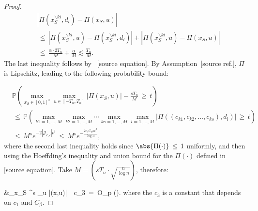 \documentclass[twoside,11pt]{article}
\makeatletter
\newcommand{\discardlabel}[1]{}
\newcommand{\discardtwo}[2]{}
\newcommand{\legacyref}[1]{\textup{[source ref.]}}
\newcommand{\legacyeqref}[1]{\textup{[source equation]}}
\newenvironment{legacycomparison}{%
  \begingroup\color{legacygray}%
  \let\label\discardlabel
  \let\originallabel\discardlabel
  \let\ref\legacyref
  \let\pageref\legacyref
  \let\eqref\legacyeqref
  \let\cref\legacyref
  \let\Cref\legacyref
  \let\autoref\legacyref
  \let\aliasref\discardtwo
}{\endgroup}
\newcommand{\aliasref}[2]{%
  \@ifundefined{r@#2}{}{%
    \expandafter\let\csname r@#1\expandafter\endcsname\csname r@#2\endcsname}}
\makeatother
\begin{document}
\begin{legacycomparison}
\begin{proof}
\begin{align*}
    &|\Pi(x_S^{\backslash ki}, d_l) - \Pi(x_S,u)| \\
    &\,\le\, |\Pi(x_S^{\backslash ki},u) - \Pi(x_S^{\backslash ki}, d_l)| + |\Pi(x_S^{\backslash ki}, u) - \Pi(x_S,u)| \\
    &\,\le\, \frac{\alpha \cdot 2T_n}{M} + \frac{\alpha}{M} \lesssim \frac{T_n}{M}.
\end{align*}
The last inequality follows by ~\eqref{lip_for_Pi}. 
By Assumption~\ref{assump:lip}, $\Pi$ is Lipschitz, leading to the following probability bound:

\begin{align*}
    &\mathbb{P}\left(\max_{x_S \in [0,1]^s} \max_{u \in [-T_n,T_n]} |\Pi(x_S,u)| - \frac{sT_n}{M} \,\ge\, t\right) \\ &\,\leq\, \mathbb{P}\left ( \max_{k1= 1, \dots, M} \max_{k2= 1, \dots, M} \cdots \max_{ks= 1, \dots, M} \max_{l= 1, \dots, M} |\Pi((c_{k1}, c_{k2}, \ldots, c_{ks}), d_l)| \,\ge\, t \right ) \\
    &\,\le\, M^s e^{-2\left|\mathcal{J}_{e,l} \right| t^2} \,\leq\, M^s e^{-\frac{2 c_1C_{\beta} n t^2}{\log n}},
\end{align*}
where the second last inequality holds since $\abs{\Pi(\cdot)} \,\leq\, 1$ uniformly, and then using the Hoeffding's inequality and union bound for the $\Pi(\cdot)$ defined in \eqref{pi_def}. 
Take $M = \left(sT_n \cdot \sqrt{\frac{n}{\log n}}\right)$, therefore:

\beq 
\label{in1116}
    &\max_{x_S \in [0,1]^s} \max_{u \in [-T_n, T_n]} |\Pi(x,u)| \,\leq\, c_3 \,=\, O_p \left(\right).
\beq 
where the $c_3$ is a constant that depends on $c_1$ and $C_{\beta}$. 


\end{proof}
\end{legacycomparison}
\end{document}
